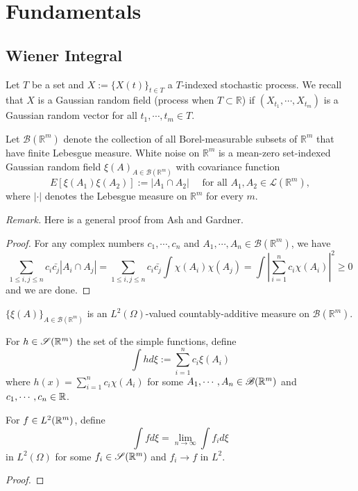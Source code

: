 \newcommand{\Borel}[1]{\mathscr{B}(\mathbb{R}^{#1})}
\newcommand{\bors}{\mathscr{B}}
\newcommand{\simp}{\mathscr{S}}
\newcommand{\E}{\mathbb{E}}
\appendix

\section{Fundamentals}

\subsection{Wiener Integral}

Let $T$ be a set and $X := \{X(t)\}_{t\in T}$ a $T$-indexed stochastic process. We recall that $X$ is a Gaussian random field (process when $T \subset \mathbb{R}$) if $(X_{t_1} ,\cdots,X_{t_m})$ is a Gaussian random vector for all $t_1,\cdots,t_m \in T$.\par

\begin{definition}
Let $\Borel{m}$ denote the collection of all Borel-measurable subsets of $\mathbb{R}^m$ that have finite Lebesgue measure. White noise on $\mathbb{R}^m$ is a mean-zero set-indexed Gaussian random field ${\xi(A)}_{A\in \Borel{m}}$ with covariance function
\[E[\xi(A_1)\xi(A_2)] := |A_1 \cap A_2| \quad\text{ for all } A_1, A_2 \in \mathscr{L}(\mathbb{R}^m), \]
where $|\cdot|$ denotes the Lebesgue measure on $\mathbb{R}^m$ for every $m$.
\end{definition}
\emph{Remark.} Here is a general proof from Ash and Gardner.
\begin{proof}
    For any complex numbers $c_1,\cdots,c_n$ and $A_1,\cdots,A_n \in \Borel{m}$, we have
    \[
    \sum\limits_{1\leq i,j\leq n} c_i\bar{c_j} |A_i\cap A_j| = \sum\limits_{1\leq i,j\leq n}c_i\bar{c_j}\int \chi(A_i)\chi(A_j) = \int \left|\sum\limits_{i=1}^n c_i\chi(A_i)\right|^2 \geq 0
    \]
    and we are done.
\end{proof}

\begin{lemma}
    $\{\xi(A)\}_{A \in \Borel{m}}$ is an $L^2(\Omega)$-valued countably-additive measure on $\Borel{m}$.
\end{lemma}

\begin{definition}\par
    For $h \in \simp(\R^m)$ the set of the simple functions, define
    \[
    \int h d\xi := \sum\limits_{i=1}^n c_i\xi(A_i)
    \]
    where $h(x) = \sum\limits_{i=1}^n c_i\chi(A_i)$ for some $A_1,\cdots,A_n\in\bors(\R^m)$ and $c_1,\cdots,c_n \in \mathbb{R}$.\par
    For $f\in L^2(\mathbb{R}^m)$, define 
    \[
    \int f d\xi = \lim_{n\to\infty} \int f_i d\xi
    \]
    in $L^2(\Omega)$ for some $f_i\in \simp(\R^m)$ and $f_i \to f$ in $L^2$.
\end{definition}
\begin{proof}
    
\end{proof}

